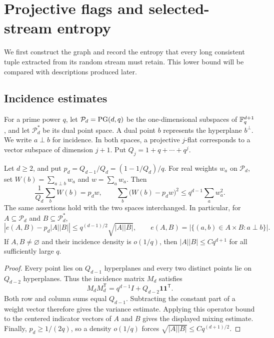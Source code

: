 \section{Projective flags and selected-stream entropy}
\label{sec:flags}

We first construct the graph and record the entropy that every long
consistent tuple extracted from its random stream must retain.
This lower bound will be compared with descriptions produced later.

\subsection{Incidence estimates}

For a prime power \(q\), let \(\mathcal P_d=\operatorname{PG}(d,q)\) be the
one-dimensional subspaces of \(\mathbb F_q^{d+1}\), and let
\(\mathcal P_d^*\) be its dual point space. A dual point \(b\)
represents the hyperplane \(b^\perp\). We write \(a\perp b\)
for incidence. In both spaces, a projective \(j\)-flat corresponds
to a vector subspace of dimension \(j+1\).
Put \(Q_j=1+q+\cdots+q^j\).

\begin{lemma}
\label{lem:incidence}
Let \(d\ge2\), and put \(p_d=Q_{d-1}/Q_d=(1-1/Q_d)/q\).
For real weights \(w_a\) on \(\mathcal P_d\), set
\(W(b)=\sum_{a\perp b}w_a\) and \(w=\sum_a w_a\). Then
\[
 \frac1{Q_d}\sum_b W(b)=p_dw,\qquad
 \sum_b\bigl(W(b)-p_dw\bigr)^2
 \le q^{d-1}\sum_a w_a^2.
\]
The same assertions hold with the two spaces interchanged.
In particular, for \(A\subseteq\mathcal P_d\) and
\(B\subseteq\mathcal P_d^*\),
\[
 \left|e(A,B)-p_d|A||B|\right|
 \le q^{(d-1)/2}\sqrt{|A||B|},
 \qquad
 e(A,B)=|\{(a,b)\in A\times B:a\perp b\}|.
\]
If \(A,B\ne\varnothing\) and their incidence density is \(o(1/q)\),
then \(|A||B|\le Cq^{d+1}\) for all sufficiently large \(q\).
\end{lemma}

\begin{proof}
Every point lies on \(Q_{d-1}\) hyperplanes and every two distinct
points lie on \(Q_{d-2}\) hyperplanes. Thus the incidence matrix
\(M_d\) satisfies
\[
 M_dM_d^{\mathsf T}=q^{d-1}I+Q_{d-2}\mathbf1\mathbf1^{\mathsf T}.
\]
Both row and column sums equal \(Q_{d-1}\). Subtracting the constant
part of a weight vector therefore gives the variance estimate.
Applying this operator bound to the centered indicator vectors of
\(A\) and \(B\) gives the displayed mixing estimate. Finally,
\(p_d\ge1/(2q)\), so a density \(o(1/q)\) forces
\(\sqrt{|A||B|}\le Cq^{(d+1)/2}\).
\end{proof}

